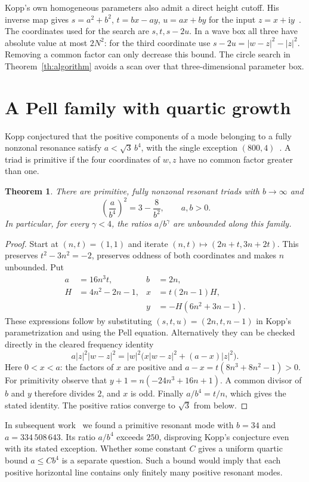 \documentclass[11pt]{article}
\newtheorem{theorem}{Theorem}
\newcommand{\ii}{\mathrm i}
\begin{document}
Kopp's own homogeneous parameters also admit a direct height cutoff. His inverse map gives $s=a^2+b^2$, $t=bx-ay$, $u=ax+by$ for the input $z=x+\ii y$~\cite[Theorem~2, (1.23)]{Kopp}. The coordinates used for the search are $s,t,s-2u$. In a wave box all three have absolute value at most $2N^2$: for the third coordinate use $s-2u=|w-z|^2-|z|^2$. Removing a common factor can only decrease this bound. The circle search in Theorem~\ref{th:algorithm} avoids a scan over that three-dimensional parameter box.

\section{A Pell family with quartic growth}
Kopp conjectured that the positive components of a mode belonging to a fully nonzonal resonance satisfy $a<\sqrt3\,b^4$, with the single exception $(800,4)$~\cite[Conjecture 5]{Kopp}. A triad is primitive if the four coordinates of $w,z$ have no common factor greater than one.
\begin{theorem}\label{th:sharp}
There are primitive, fully nonzonal resonant triads with $b\to\infty$ and
\[
 \,\left(\frac{a}{b^4}\right)^2=3-\frac{8}{b^2},\qquad a,b>0.
\]
In particular, for every $\gamma<4$, the ratios $a/b^\gamma$ are unbounded along this family.
\end{theorem}
\begin{proof}
Start at $(n,t)=(1,1)$ and iterate $(n,t)\mapsto(2n+t,3n+2t)$. This preserves $t^2-3n^2=-2$, preserves oddness of both coordinates and makes $n$ unbounded. Put
\[
\begin{aligned}
 a&=16n^3t,& b&=2n,\\
 H&=4n^2-2n-1,& x&=t(2n-1)H,\\
 &&y&=-H(6n^2+3n-1).
\end{aligned}
\]
These expressions follow by substituting $(s,t,u)=(2n,t,n-1)$ in Kopp's parametrization and using the Pell equation. Alternatively they can be checked directly in the cleared frequency identity
\[
 a|z|^2|w-z|^2=|w|^2\big(x|w-z|^2+(a-x)|z|^2\big).
\]
Here $0<x<a$: the factors of $x$ are positive and $a-x=t(8n^3+8n^2-1)>0$. For primitivity observe that $y+1=n(-24n^3+16n+1)$. A common divisor of $b$ and $y$ therefore divides $2$, and $x$ is odd. Finally $a/b^4=t/n$, which gives the stated identity. The positive ratios converge to $\sqrt3$ from below.
\end{proof}
In subsequent work~\cite[Theorem~1]{Counterexamples} we found a primitive resonant mode with $b=34$ and $a=334\,508\,643$. Its ratio $a/b^4$ exceeds $250$, disproving Kopp's conjecture even with its stated exception. Whether some constant $C$ gives a uniform quartic bound $a\le Cb^4$ is a separate question. Such a bound would imply that each positive horizontal line contains only finitely many positive resonant modes.
\end{document}
